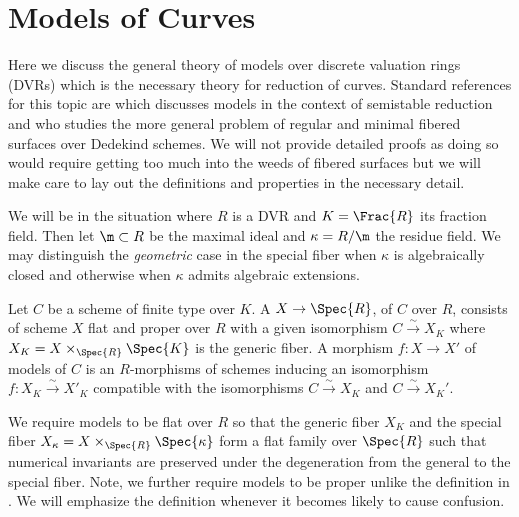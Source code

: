 \newcommand{\X}{\mathcal{X}}

\section{Models of Curves}

Here we discuss the general theory of models over discrete valuation rings (DVRs) which is the necessary theory for reduction of curves. Standard references for this topic are \cite[\href{https://stacks.math.columbia.edu/tag/0C2R}{Tag 0C2R}]{stacks-project} which discusses models in the context of semistable reduction and \cite[Chapter 9]{liu} who studies the more general problem of regular and minimal fibered surfaces over Dedekind schemes. We will not provide detailed proofs as doing so would require getting too much into the weeds of fibered surfaces but we will make care to lay out the definitions and properties in the necessary detail.

\begin{rmk}
We will be in the situation where $R$ is a DVR and $K = \Frac{R}$ its fraction field. Then let $\m \subset R$ be the maximal ideal and $\kappa = R / \m$ the residue field. We may distinguish the \textit{geometric} case in the special fiber when $\kappa$ is algebraically closed and otherwise when $\kappa$ admits algebraic extensions. 
\end{rmk}

\begin{defn}
Let $C$ be a scheme of finite type over $K$. A  $X \to \Spec{R}$, of $C$ over $R$, consists of scheme $X$ flat and proper over $R$ with a given isomorphism $C \xrightarrow{\sim} X_K$ where $X_K = X \times_{\Spec{R}} \Spec{K}$ is the generic fiber. A morphism $f : X \to X'$ of models of $C$ is an $R$-morphisms of schemes inducing an isomorphism $f : X_K \xrightarrow{\sim} X'_K$ compatible with the isomorphisms $C \xrightarrow{\sim} X_K$ and $C \xrightarrow{\sim} X_K'$.
\end{defn}

\begin{rmk}
We require models to be flat over $R$ so that the generic fiber $X_K$ and the special fiber $X_\kappa = X \times_{\Spec{R}} \Spec{\kappa}$ form a flat family over $\Spec{R}$ such that numerical invariants are preserved under the degeneration from the general to the special fiber. Note, we further require models to be proper unlike the definition in \cite[\href{https://stacks.math.columbia.edu/tag/0C2R}{Tag 0C2R}]{stacks-project}. We will emphasize the definition whenever it becomes likely to cause confusion.
\end{rmk}

